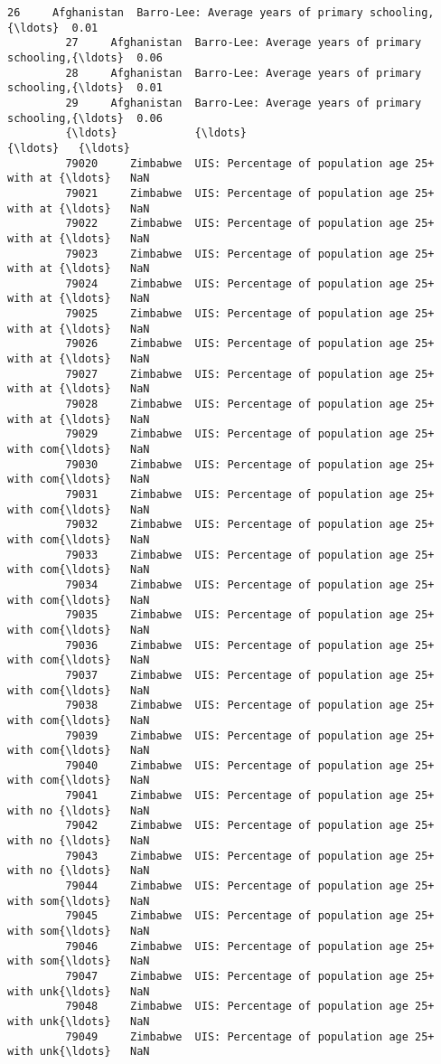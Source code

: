 \documentclass[11pt]{article}
\begin{document}
\begin{Verbatim}[commandchars=\\\{\}]
         26     Afghanistan  Barro-Lee: Average years of primary schooling,{\ldots}  0.01   
         27     Afghanistan  Barro-Lee: Average years of primary schooling,{\ldots}  0.06   
         28     Afghanistan  Barro-Lee: Average years of primary schooling,{\ldots}  0.01   
         29     Afghanistan  Barro-Lee: Average years of primary schooling,{\ldots}  0.06   
         {\ldots}            {\ldots}                                                {\ldots}   {\ldots}   
         79020     Zimbabwe  UIS: Percentage of population age 25+ with at {\ldots}   NaN   
         79021     Zimbabwe  UIS: Percentage of population age 25+ with at {\ldots}   NaN   
         79022     Zimbabwe  UIS: Percentage of population age 25+ with at {\ldots}   NaN   
         79023     Zimbabwe  UIS: Percentage of population age 25+ with at {\ldots}   NaN   
         79024     Zimbabwe  UIS: Percentage of population age 25+ with at {\ldots}   NaN   
         79025     Zimbabwe  UIS: Percentage of population age 25+ with at {\ldots}   NaN   
         79026     Zimbabwe  UIS: Percentage of population age 25+ with at {\ldots}   NaN   
         79027     Zimbabwe  UIS: Percentage of population age 25+ with at {\ldots}   NaN   
         79028     Zimbabwe  UIS: Percentage of population age 25+ with at {\ldots}   NaN   
         79029     Zimbabwe  UIS: Percentage of population age 25+ with com{\ldots}   NaN   
         79030     Zimbabwe  UIS: Percentage of population age 25+ with com{\ldots}   NaN   
         79031     Zimbabwe  UIS: Percentage of population age 25+ with com{\ldots}   NaN   
         79032     Zimbabwe  UIS: Percentage of population age 25+ with com{\ldots}   NaN   
         79033     Zimbabwe  UIS: Percentage of population age 25+ with com{\ldots}   NaN   
         79034     Zimbabwe  UIS: Percentage of population age 25+ with com{\ldots}   NaN   
         79035     Zimbabwe  UIS: Percentage of population age 25+ with com{\ldots}   NaN   
         79036     Zimbabwe  UIS: Percentage of population age 25+ with com{\ldots}   NaN   
         79037     Zimbabwe  UIS: Percentage of population age 25+ with com{\ldots}   NaN   
         79038     Zimbabwe  UIS: Percentage of population age 25+ with com{\ldots}   NaN   
         79039     Zimbabwe  UIS: Percentage of population age 25+ with com{\ldots}   NaN   
         79040     Zimbabwe  UIS: Percentage of population age 25+ with com{\ldots}   NaN   
         79041     Zimbabwe  UIS: Percentage of population age 25+ with no {\ldots}   NaN   
         79042     Zimbabwe  UIS: Percentage of population age 25+ with no {\ldots}   NaN   
         79043     Zimbabwe  UIS: Percentage of population age 25+ with no {\ldots}   NaN   
         79044     Zimbabwe  UIS: Percentage of population age 25+ with som{\ldots}   NaN   
         79045     Zimbabwe  UIS: Percentage of population age 25+ with som{\ldots}   NaN   
         79046     Zimbabwe  UIS: Percentage of population age 25+ with som{\ldots}   NaN   
         79047     Zimbabwe  UIS: Percentage of population age 25+ with unk{\ldots}   NaN   
         79048     Zimbabwe  UIS: Percentage of population age 25+ with unk{\ldots}   NaN   
         79049     Zimbabwe  UIS: Percentage of population age 25+ with unk{\ldots}   NaN   
         

\end{Verbatim}
\end{document}
